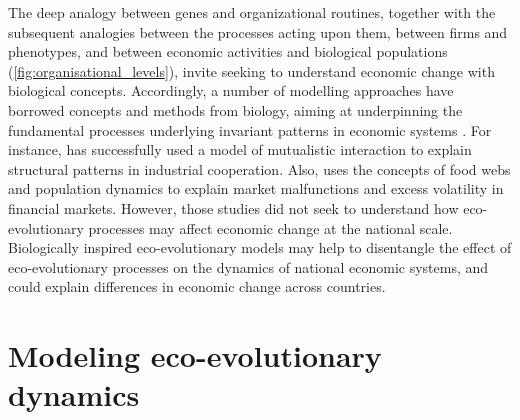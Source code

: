 The deep analogy between genes and organizational routines, together with the subsequent analogies between the processes acting upon them, between firms and phenotypes, and between economic activities and biological populations (\cref{fig:organisational_levels}), invite seeking to understand economic change with biological concepts.
% 
%
% 
% 
Accordingly, a number of modelling approaches have borrowed concepts and methods from biology, aiming at underpinning the fundamental processes underlying invariant patterns in economic systems \citep{Tacchella2018,Saavedra2009a,Scholl2020,Zhang2018,Modis1997,Saavedra2014,Farmer1999,Michalakelis2011,Marasco2016,Gatabazi2019,Cauwels56,Applegate2021,Suweis2015}. 
% 
For instance, \cite{Saavedra2009a} has successfully used a model of mutualistic interaction to explain structural patterns in industrial cooperation.
% 
Also, \cite{Scholl2020} uses the concepts of food webs and population dynamics to explain market malfunctions and excess volatility in financial markets.
% 
However, those studies did not seek to understand how eco-evolutionary processes may affect economic change at the national scale.
% 
Biologically inspired eco-evolutionary models may help to disentangle the effect of eco-evolutionary processes on the dynamics of national economic systems, and could explain differences in economic change across countries.

\section{Modeling eco-evolutionary dynamics}

